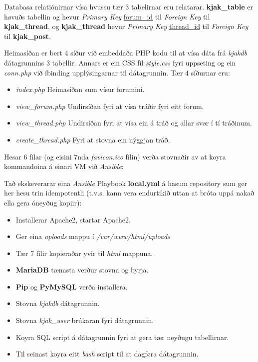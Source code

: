 \documentclass{article}
\begin{document}
\par Databasa relatiónirnar vísa hvussu
tær 3 tabelirnar eru relatarar. \textbf{kjak\_table} er høvuðs tabellin og hevur
\textit{Primary Key} \underline{forum\_id} til \textit{Foreign Key} til \textbf{kjak\_thread},
og \textbf{kjak\_thread} hevur \textit{Primary Key} \underline{thread\_id} til \textit{Foreign Key}
til \textbf{kjak\_post}.
 
\par Heimasíðan er bert 4 síður við embeddaða PHP kodu til at vísa dáta frá \textit{kjakdb}
dátagrunnins 3 tabellir. Annars er ein CSS fíl \textit{style.css} fyri uppseting
og ein \textit{conn.php} við
íbinding upplýsingarnar til dátagrunnin. Tær 4 síðurnar eru:
\begin{itemize}
    \item \textit{index.php} \- Heimasíðan sum vísur forumini.
    \item \textit{view\_forum.php} \- Undirsíðan fyri at vísa tráðir fyri eitt forum.
    \item \textit{view\_thread.php} \- Undirsíðan fyri at vísa ein á tráð og allar svør í tí
            tráðinum.
    \item \textit{create\_thread.php} \- Fyri at stovna ein nýggjan tráð.
\end{itemize}

\par Hesar 6 fílar (og eisini 7nda \textit{favicon.ico} fílin) verða stovnaðir
av at koyra kommandoina á einari VM við \textit{Ansible}:
\newline
\newline
{}
\newline
\par Tað ekskeverarar eina \textit{Ansible} Playbook \textbf{local.yml} á hasum
repository sum ger her hesu trin idempotentli (t.v.s. kann vera endurtikið uttan at
bróta uppá nakað ella gera óneyðug kopiir):
\begin{itemize}
    \item Installerar Apache2, startar Apache2.
    \item Ger eina \textit{uploads} mappu í \textit{/var/www/html/uploads}
    \item Tær 7 fílir kopieraðar yvir til \textit{html} mappuna.
    \item \textbf{MariaDB} tænasta verður stovna og byrja.
    \item \textbf{Pip} og \textbf{PyMySQL} verða installera.
    \item Stovna \textit{kjakdb} dátagrunnin.
    \item Stovna \textit{kjak\_user} brúkaran fyri dátagrunnin.
    \item Koyra SQL script á dátagrunnin fyri at gera tær neyðugu tabellirnar.
    \item Til seinast koyra eitt \textit{bash} script til at dagføra dátagrunnin.
\end{itemize}
\end{document}
